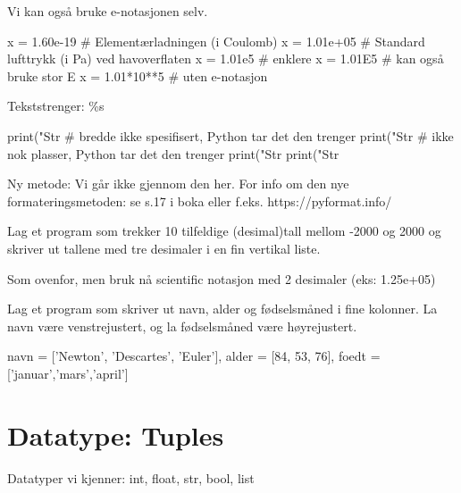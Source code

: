 {Vi kan også bruke e-notasjonen selv.
\begin{usncodebox}
x = 1.60e-19    # Elementærladningen (i Coulomb) 
x = 1.01e+05    # Standard lufttrykk (i Pa) ved havoverflaten 
x = 1.01e5      # enklere
x = 1.01E5      # kan også bruke stor E
x = 1.01*10**5  # uten e-notasjon
\end{usncodebox}

Tekststrenger: \%s

\begin{usncodebox}
print("Str %
                                  # bredde ikke spesifisert, Python tar det den trenger
print("Str %
                                  # ikke nok plasser, Python tar det den trenger
print("Str %
print("Str %
\end{usncodebox}

Ny metode:
Vi går ikke gjennom den her. For info om den nye formateringsmetoden: se s.17 i boka eller f.eks. https://pyformat.info/

\begin{question}
Lag et program som trekker 10 tilfeldige (desimal)tall mellom -2000 og 2000 og skriver ut tallene med tre desimaler i en fin vertikal liste.
\end{question}

\begin{question}
Som ovenfor, men bruk nå scientific notasjon med 2 desimaler (eks: 1.25e+05)
\end{question}

\begin{question}
Lag et program som skriver ut navn, alder og fødselsmåned i fine kolonner. La navn være venstrejustert, og la fødselsmåned være høyrejustert.
\end{question}
\begin{usncodebox}
navn = ['Newton', 'Descartes', 'Euler'], alder = [84, 53, 76], 
foedt = ['januar','mars','april']
\end{usncodebox}

\section{Datatype: Tuples}

Datatyper vi kjenner: int, float, str, bool, list 

}
